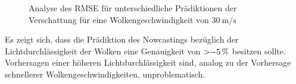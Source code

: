 \begin{figure}[t]
    \centering
    \setlength{\fboxsep}{1pt}
    \setlength{\fboxrule}{1pt}
    \caption[Analyse des RMSE für unterschiedliche Prädiktionen der Verschattung für eine Wolkengeschwindigkeit von $\SI{30}{\metre\per\second}$]{Analyse des RMSE für unterschiedliche Prädiktionen der Verschattung für eine Wolkengeschwindigkeit von $\SI{30}{\metre\per\second}$}
    \label{fig_shadingrmse}
\end{figure}

Es zeigt sich, dass die Prädiktion des Nowcastings bezüglich der Lichtdurchlässigkeit der Wolken eine Genauigkeit von $\SI{>-5}{\percent}$ besitzen sollte.
Vorhersagen einer höheren Lichtdurchlässigkeit sind, analog zu der Vorhersage schnellerer Wolkengeschwindigkeiten, unproblematisch.
